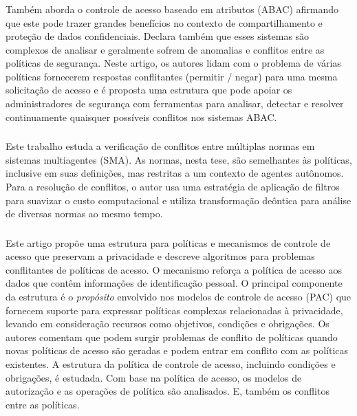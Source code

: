 \subsubsection{ }
Também aborda o controle de acesso baseado em atributos (ABAC) afirmando que este pode trazer grandes benefícios no contexto de compartilhamento e proteção de dados confidenciais. Declara também que esses sistemas são complexos de analisar e geralmente sofrem de anomalias e conflitos entre as políticas de segurança. Neste artigo, os autores lidam com o problema de várias políticas fornecerem respostas conflitantes (permitir / negar) para uma mesma solicitação de acesso e é proposta uma estrutura que pode apoiar os administradores de segurança com ferramentas para analisar, detectar e resolver continuamente quaisquer possíveis conflitos nos sistemas ABAC.

\subsubsection{ } 
Este trabalho estuda a verificação de conflitos entre múltiplas normas em sistemas multiagentes (SMA). As normas, nesta tese, são semelhantes às políticas, inclusive em suas definições, mas restritas a um contexto de agentes autônomos. Para a resolução de conflitos, o autor usa uma estratégia de aplicação de filtros para suavizar o custo computacional e utiliza transformação deôntica para análise de diversas normas ao mesmo tempo. %

\subsubsection{ }
Este artigo propõe uma estrutura para políticas e mecanismos de controle de acesso que preservam a privacidade e descreve algoritmos para problemas conflitantes de políticas de acesso. O mecanismo reforça a política de acesso aos dados que contêm informações de identificação pessoal. O principal componente da estrutura é o \textit{propósito} envolvido nos modelos de controle de acesso (PAC) que fornecem suporte para expressar políticas complexas relacionadas à privacidade, levando em consideração recursos como objetivos, condições e obrigações. Os autores comentam que podem surgir problemas de conflito de políticas quando novas políticas de acesso são geradas e podem entrar em conflito com as políticas existentes. A estrutura da política de controle de acesso, incluindo condições e obrigações, é estudada. Com base na política de acesso, os modelos de autorização e as operações de política são analisados. E, também os conflitos entre as políticas.

